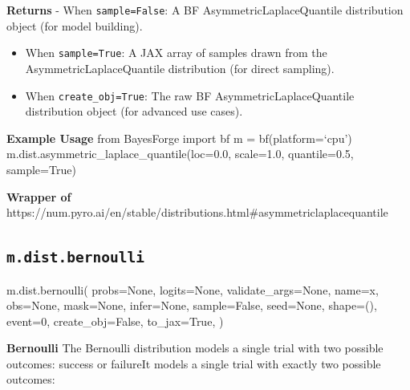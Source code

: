 \documentclass[
  letterpaper,
  DIV=11,
  numbers=noendperiod]{scrartcl}
\newenvironment{Shaded}{\begin{snugshade}}{\end{snugshade}}
\newcommand{\DecValTok}[1]{\textcolor[rgb]{0.68,0.00,0.00}{#1}}
\newcommand{\NormalTok}[1]{\textcolor[rgb]{0.00,0.23,0.31}{#1}}
\newcommand{\OperatorTok}[1]{\textcolor[rgb]{0.37,0.37,0.37}{#1}}
\newcommand{\StringTok}[1]{\textcolor[rgb]{0.13,0.47,0.30}{#1}}
\newcommand{\VariableTok}[1]{\textcolor[rgb]{0.07,0.07,0.07}{#1}}
\begin{document}
\textbf{Returns} - When \texttt{sample=False}: A BF
AsymmetricLaplaceQuantile distribution object (for model building).

\begin{itemize}
\item
  When \texttt{sample=True}: A JAX array of samples drawn from the
  AsymmetricLaplaceQuantile distribution (for direct sampling).
\item
  When \texttt{create\_obj=True}: The raw BF AsymmetricLaplaceQuantile
  distribution object (for advanced use cases).
\end{itemize}

\textbf{Example Usage} from BayesForge import bf m = bf(platform=`cpu')
m.dist.asymmetric\_laplace\_quantile(loc=0.0, scale=1.0, quantile=0.5,
sample=True)

\textbf{Wrapper of}
https://num.pyro.ai/en/stable/distributions.html\#asymmetriclaplacequantile

\subsection{\texorpdfstring{\texttt{m.dist.bernoulli}}{m.dist.bernoulli}}\label{bernoulli}

\begin{Shaded}
\begin{Highlighting}[]
\NormalTok{m.dist.bernoulli(}
\NormalTok{    probs}\OperatorTok{=}\VariableTok{None}\NormalTok{,}
\NormalTok{    logits}\OperatorTok{=}\VariableTok{None}\NormalTok{,}
\NormalTok{    validate\_args}\OperatorTok{=}\VariableTok{None}\NormalTok{,}
\NormalTok{    name}\OperatorTok{=}\StringTok{\textquotesingle{}x\textquotesingle{}}\NormalTok{,}
\NormalTok{    obs}\OperatorTok{=}\VariableTok{None}\NormalTok{,}
\NormalTok{    mask}\OperatorTok{=}\VariableTok{None}\NormalTok{,}
\NormalTok{    infer}\OperatorTok{=}\VariableTok{None}\NormalTok{,}
\NormalTok{    sample}\OperatorTok{=}\VariableTok{False}\NormalTok{,}
\NormalTok{    seed}\OperatorTok{=}\VariableTok{None}\NormalTok{,}
\NormalTok{    shape}\OperatorTok{=}\NormalTok{(),}
\NormalTok{    event}\OperatorTok{=}\DecValTok{0}\NormalTok{,}
\NormalTok{    create\_obj}\OperatorTok{=}\VariableTok{False}\NormalTok{,}
\NormalTok{    to\_jax}\OperatorTok{=}\VariableTok{True}\NormalTok{,}
\NormalTok{)}
\end{Highlighting}
\end{Shaded}

\textbf{Bernoulli} The Bernoulli distribution models a single trial with
two possible outcomes: success or failureIt models a single trial with
exactly two possible outcomes:
\end{document}
